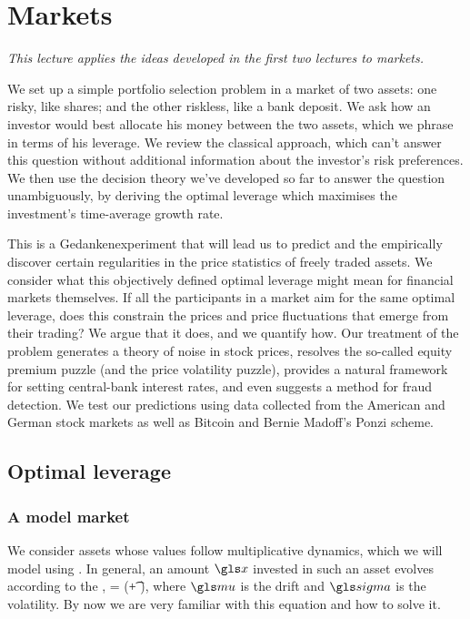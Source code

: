 \newpage

\section{Markets}

{\it This lecture applies the ideas developed in the first two lectures to markets. 

We set up a simple portfolio selection problem in a market of two assets: one risky, like shares; and the other riskless, like a bank deposit. We ask how an investor would best allocate his money between the two assets, which we phrase in terms of his leverage. We review the classical approach, which can't answer this question without additional information about the investor's risk preferences. We then use the decision theory we've developed so far to answer the question unambiguously, by deriving the optimal leverage which maximises the investment's time-average growth rate. 

This is a Gedankenexperiment that will lead us to predict and the empirically discover certain regularities in the price statistics of freely traded assets. We consider what this objectively defined optimal leverage might mean for financial markets themselves. If all the participants in a market aim for the same optimal leverage, does this constrain the prices and price fluctuations that emerge from their trading? We argue that it does, and we quantify how. Our treatment of the problem generates a theory of noise in stock prices, resolves the so-called equity premium puzzle (and the price volatility puzzle), provides a natural framework for setting central-bank interest rates, and even suggests a method for fraud detection.
We test our predictions using data collected from the American and German stock markets as well as Bitcoin and Bernie Madoff's Ponzi scheme.
}

\newpage


\subsection{Optimal leverage}

\subsubsection{A model market}
We consider assets whose values follow multiplicative dynamics, which we will model using \GBM. In general, an amount $\x$ invested in such an asset evolves according to the \SDE,
\be
\gd\x = \x(\gmu \gd\t + \gsigma \gd\gW),
\ee
where $\gmu$ is the drift and $\gsigma$ is the volatility. By now we are very familiar with this equation and how to solve it.

